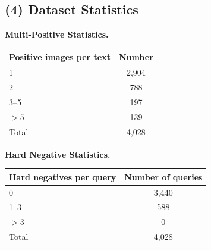 \subsection{(4) Dataset Statistics}

\begin{table}[htbp]
    \centering
    \begin{minipage}[t]{0.47\textwidth}
        \centering
        \textbf{Multi-Positive Statistics.}
        \label{tab:multi-positive-statistics}
        \begin{tabular}{|l|c|}
            \hline
            Positive images per text & Number \\
            \hline
            1 & 2,904 \\
            2 & 788 \\
            3--5 & 197 \\
            $>5$ & 139 \\
            \hline
            Total & 4,028 \\
            \hline
        \end{tabular}
    \end{minipage}
    \hfill
    \begin{minipage}[t]{0.47\textwidth}
        \centering
        \textbf{Hard Negative Statistics.}
        \label{tab:hard-negative-statistics}
        \begin{tabular}{|l|c|}
            \hline
            Hard negatives per query & Number of queries \\
            \hline
            0 & 3,440 \\
            1--3 & 588 \\
            $>3$ & 0 \\
            \hline
            Total & 4,028 \\
            \hline
        \end{tabular}
    \end{minipage}
\end{table}

